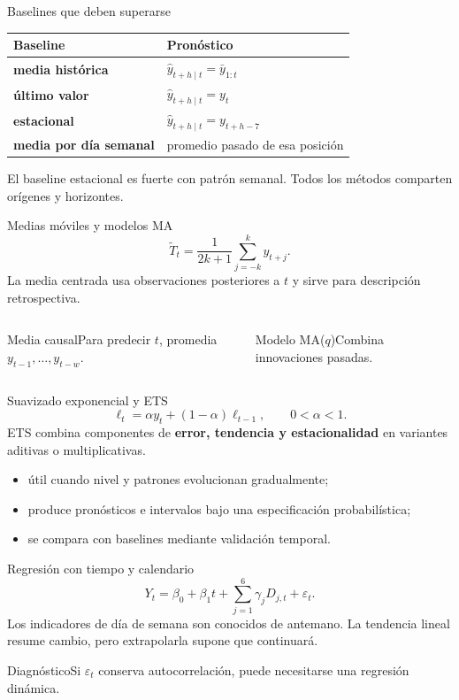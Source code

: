 \documentclass[aspectratio=169,10pt]{beamer}
\newcommand{\concepto}[1]{\textcolor{UAPTeal}{\textbf{#1}}}
\begin{document}
\begin{frame}{Baselines que deben superarse}\small
\begin{tabularx}{\textwidth}{>{\bfseries}p{}X}\toprule Baseline & Pronóstico\\\midrule media histórica & $\widehat y_{t+h\mid t}=\bar y_{1:t}$\\ último valor & $\widehat y_{t+h\mid t}=y_t$\\ estacional & $\widehat y_{t+h\mid t}=y_{t+h-7}$\\ media por día semanal & promedio pasado de esa posición\\\bottomrule\end{tabularx}
El baseline estacional es fuerte con patrón semanal. Todos los métodos comparten orígenes y horizontes.
\end{frame}

\begin{frame}{Medias móviles y modelos MA}\small
\[\widetilde T_t=\frac{1}{2k+1}\sum_{j=-k}^{k}y_{t+j}.\]
La media centrada usa observaciones posteriores a $t$ y sirve para descripción retrospectiva.
\begin{columns}[T]\begin{block}{Media causal}Para predecir $t$, promedia $y_{t-1},\ldots,y_{t-w}$.\end{block}\begin{block}{Modelo MA($q$)}Combina innovaciones pasadas.\end{block}\end{columns}
\end{frame}

\begin{frame}{Suavizado exponencial y ETS}\small
\[\ell_t=\alpha y_t+(1-\alpha)\ell_{t-1},\qquad 0<\alpha<1.\]
ETS combina componentes de \concepto{error, tendencia y estacionalidad} en variantes aditivas o multiplicativas.
\begin{itemize}\item útil cuando nivel y patrones evolucionan gradualmente;\item produce pronósticos e intervalos bajo una especificación probabilística;\item se compara con baselines mediante validación temporal.\end{itemize}
\end{frame}

\begin{frame}{Regresión con tiempo y calendario}\small
\[Y_t=\beta_0+\beta_1t+\sum_{j=1}^{6}\gamma_jD_{j,t}+\varepsilon_t.\]
Los indicadores de día de semana son conocidos de antemano. La tendencia lineal resume cambio, pero extrapolarla supone que continuará.
\begin{block}{Diagnóstico}Si $\varepsilon_t$ conserva autocorrelación, puede necesitarse una regresión dinámica.\end{block}
\end{frame}
\end{document}
